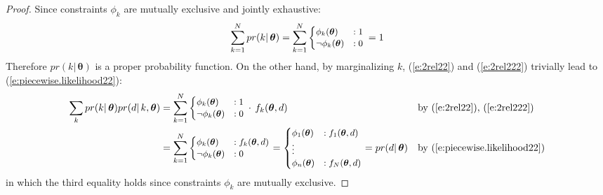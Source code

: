 \begin{proof}
Since constraints $\phi_k$ are mutually exclusive and jointly exhaustive: 
$$\sum_{k= 1}^N pr(k | \, \boldsymbol\theta) = 
\sum_{k=1}^N
{\footnotesize
\begin{cases}
\phi_k(\boldsymbol\theta)   &: 1\\
\neg \phi_k(\boldsymbol\theta)  &: 0
\end{cases}
}%
\, =1
$$
Therefore $pr(k | \, \boldsymbol\theta)$ is a proper probability function. 
On the other hand, by marginalizing $k$, (\ref{e:2rel22}) and (\ref{e:2rel222}) trivially lead to (\ref{e:piecewise.likelihood22}):
\begin{align*}
\sum_{k} pr(k | \, \boldsymbol\theta)pr(d | \, k, \boldsymbol\theta) 
&= 
\sum_{k=1}^N  
{\footnotesize
\begin{cases}
\phi_k(\boldsymbol\theta)  &: 1\\
\neg \phi_k(\boldsymbol\theta) &: 0
\end{cases}
}%
\, \cdot \, f_k(\boldsymbol \theta, d)
&&\text{by (\ref{e:2rel22}), (\ref{e:2rel222})}
\\
&=
\sum_{k=1}^N 
{\footnotesize
\begin{cases}
		\phi_k(\boldsymbol\theta)  &: f_k(\boldsymbol\theta, d)\\
\neg 	\phi_k(\boldsymbol\theta)  &: 0
\end{cases}
}%
= {\footnotesize
\begin{cases}
\phi_1(\boldsymbol\theta)  &: f_1(\boldsymbol\theta, d)\\
\vdots\\
\phi_n(\boldsymbol\theta)  &: f_N(\boldsymbol\theta, d)
\end{cases}
}%
= pr(d | \, \boldsymbol\theta) 
&&\text{by (\ref{e:piecewise.likelihood22})}
\end{align*}
in which the third equality holds since constraints $\phi_k$ are mutually exclusive. 
\end{proof}
 
